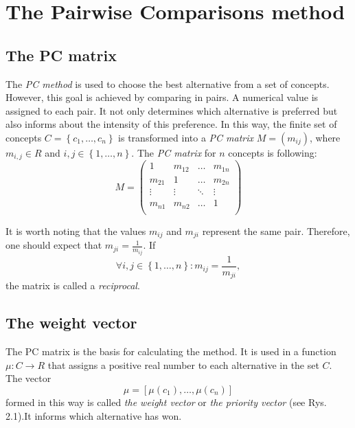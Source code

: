 \chapter{The Pairwise Comparisons method}
\label{sec:pcMethod}
  \section{The PC matrix}
	\label{subsec:macierzPC}
	
	The \textit{PC method} is used to choose the best alternative from a set of concepts. However, this goal is achieved by comparing in pairs. A numerical value is assigned to each pair. It not only determines which alternative is preferred but also informs about the intensity of this preference. In this way, the finite set of concepts $C=\left\{ c_{1},\ldots,c_{n}\right\} $ is transformed into a \textit{PC matrix} $M=\left(m_{ij}\right)$, where $m_{i,j}\in R$ and $i,j\in\left\{ 1,\ldots,n\right\}$. The \textit{PC matrix} for $n$ concepts is following:
$$
M = 
\left(
\begin{array}{lllll}
	1 & m_{12} & \dots & m_{1n}\\
	m_{21} & 1 & \dots & m_{2n}\\
	\vdots & \vdots & \ddots & \vdots\\
	m_{n1} & m_{n2} & \dots & 1\\ 	
\end{array}
\right)
$$

	It is worth noting that the values $m_{ij}$ and $m_{ji}$ represent the same pair. Therefore, one should expect that $m_{ji}=\frac{1}{m_{ij}}$. If
	\begin{equation} 
		\forall i,j\in\left\{ 1,\ldots,n\right\} :m_{ij}=\frac{1}{m_{ji}},
	\end{equation}
		the matrix is called a \textit{reciprocal}.

  \section{The weight vector}
	\label{subsec:wektorWag}
	
	The PC matrix is the basis for calculating the method. It is used in a function $\mu:C\rightarrow R$ that assigns a positive real number to each alternative in the set $C$. The vector $$\mu=\left[\mu\left(c_{1}\right),\ldots,\mu\left(c_{n}\right)\right]$$ formed in this way is called \textit{the weight vector} or \textit{the priority vector} (see Rys. 2.1).It informs which alternative has won.

